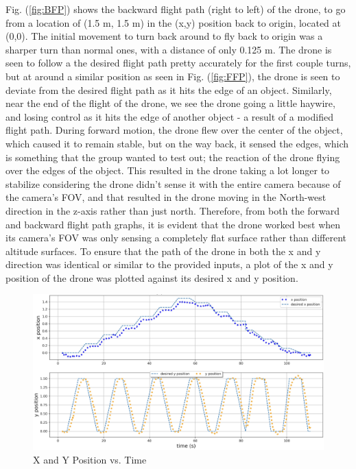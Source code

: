 Fig. (\ref{fig:BFP}) shows the backward flight path (right to left) of the drone, to go from a location of (1.5 m, 1.5 m) in the (x,y) position back to origin, located at (0,0). The initial movement to turn back around to fly back to origin was a sharper turn than normal ones, with a distance of only 0.125 m. The drone is seen to follow a the desired flight path pretty accurately for the first couple turns, but at around a similar position as seen in Fig. (\ref{fig:FFP}), the drone is seen to deviate from the desired flight path as it hits the edge of an object. Similarly, near the end of the flight of the drone, we see the drone going a little haywire, and losing control as it hits the edge of another object - a result of a modified flight path. During forward motion, the drone flew over the center of the object, which caused it to remain stable, but on the way back, it sensed the edges, which is something that the group wanted to test out; the reaction of the drone flying over the edges of the object. This resulted in the drone taking a lot longer to stabilize considering the drone didn't sense it with the entire camera because of the camera's FOV, and that resulted in the drone moving in the North-west direction in the z-axis rather than just north. Therefore, from both the forward and backward flight path graphs, it is evident that the drone worked best when its camera's FOV was only sensing a completely flat surface rather than different altitude surfaces. To ensure that the path of the drone in both the x and y direction was identical or similar to the provided inputs, a plot of the x and y position of the drone was plotted against its desired x and y position.

\begin{figure}[H]
  \centering
  \includegraphics[width=0.8\linewidth, height=0.6\linewidth]{R&D/PvsT.png}  
  \caption{X and Y Position vs. Time}
  \label{fig:PvsT}
\end{figure}

